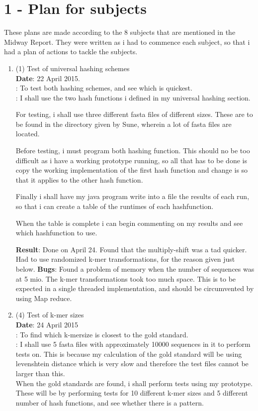 \documentclass[../../main.tex]{subfiles}
\begin{document}
\section*{1 - Plan for subjects}
These plans are made according to the 8 subjects that are mentioned in the Midway Report. They were written as i had to commence each subject, so that i had a plan of actions to tackle the subjects.
\begin{enumerate}
\item (1) Test of universal hashing schemes\\
{\bf Date}: 22 April 2015.\\
: To test both hashing schemes, and see which is quickest.\\
: I shall use the two hash functions i defined in my universal hashing section.

For testing, i shall use three different fasta files of different sizes. These are to be found in the directory given by Sune, wherein a lot of fasta files are located. 

Before testing, i must program both hashing function. This should no be too difficult as i have a working prototype running, so all that has to be done is copy the working implementation of the first hash function and change is so that it applies to the other hash function. 

Finally i shall have my java program write into a file the results of each run, so that i can create a table of the runtimes of each hashfunction. 

When the table is complete i can begin commenting on my results and see which hashfunction to use.


{\bf Result}: Done on April 24. Found that the multiply-shift was a tad quicker. Had to use randomized k-mer transformations, for the reason given just below.
{\bf Bugs}: Found a problem of memory when the number of sequences was at 5 mio. The k-mer transformations took too much space. This is to be expected in a single threaded implementation, and should be circumvented by using Map reduce. 

\item (4) Test of k-mer sizes\\
{\bf Date}: 24 April 2015\\
: To find which k-mersize is closest to the gold standard.\\
: I shall use 5 fasta files with approximately 10000 sequences in it to perform tests on. This is because my calculation of the gold standard will be using levenshtein distance which is very slow and therefore the test files cannot be larger than this.\\

When the gold standards are found, i shall perform tests using my prototype. These will be by performing tests for 10 different k-mer sizes and 5 different number of hash functions, and see whether there is a pattern.\\

\end{enumerate}
\end{document}
